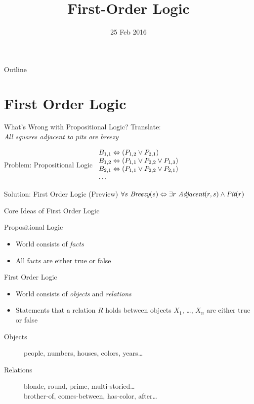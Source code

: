 \documentclass[14pt]{beamer}
\title{First-Order Logic}
\date{25 Feb 2016}
\begin{document}
\begin{frame}
	\titlepage
\end{frame}
\begin{frame}{Outline}
	\tableofcontents
\end{frame}

\section{First Order Logic}
\begin{frame}{What's Wrong with Propositional Logic?}
	Translate: \\
	\tab\emph{All squares adjacent to pits are breezy}
	\pause
	\begin{block}{Problem: Propositional Logic}
		$
		\begin{array}{l}
		B_{1,1} \Leftrightarrow (P_{1,2} \lor P_{2,1}) \\
		B_{1,2} \Leftrightarrow (P_{1,1} \lor P_{2,2} \lor P_{1,3}) \\
		B_{2,1} \Leftrightarrow (P_{1,1} \lor P_{2,2} \lor P_{2,1}) \\
		\ldots
		\end{array}
		$
	\end{block}
	\pause
	\begin{block}{Solution: First Order Logic (Preview)}
		$\forall s\ \textit{Breezy}(s) \liff \exists r\ \textit{Adjacent}(r, s) \land \textit{Pit}(r)$
	\end{block}
\end{frame}
\begin{frame}{Core Ideas of First Order Logic}
	\begin{block}{Propositional Logic}
		\begin{itemize}
			\item World consists of \emph{facts}
			\item All facts are either true or false
		\end{itemize}
	\end{block}
	\pause
	\begin{block}{First Order Logic}
		\begin{itemize}
			\item World consists of \emph{objects} and \emph{relations}
			\item Statements that a relation $R$ holds between objects $X_1$, \ldots, $X_n$ are either true or false
		\end{itemize}
		\pause
		\begin{description}
			\item[Objects] people, numbers, houses, colors, years\ldots
			\item[Relations]
				blonde, round, prime, multi-storied\ldots \\
			  brother-of, comes-between, has-color, after\ldots
		\end{description}
	\end{block}
\end{frame}
\end{document}
